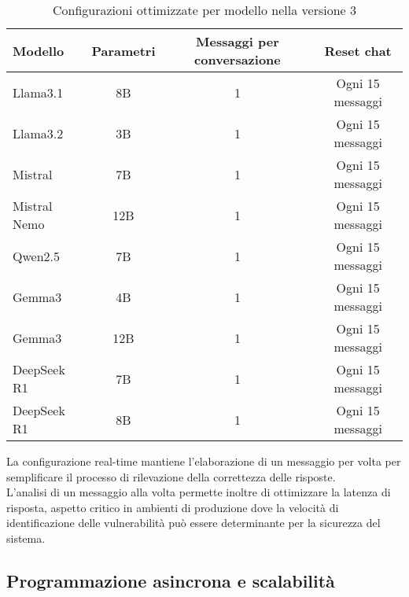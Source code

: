 \documentclass[12pt]{report}
\begin{document}
\begin{table}[h!]
    \centering
    \begin{tabular}{|l|c|c|c|}
        \hline
        \textbf{Modello} & \textbf{Parametri} & \textbf{Messaggi per conversazione} & \textbf{Reset chat} \\ \hline
        Llama3.1         & 8B                 & 1                                   & Ogni 15 messaggi    \\ \hline
        Llama3.2         & 3B                 & 1                                   & Ogni 15 messaggi    \\ \hline
        Mistral          & 7B                 & 1                                   & Ogni 15 messaggi    \\ \hline
        Mistral Nemo     & 12B                & 1                                   & Ogni 15 messaggi    \\ \hline
        Qwen2.5          & 7B                 & 1                                   & Ogni 15 messaggi    \\ \hline
        Gemma3           & 4B                 & 1                                   & Ogni 15 messaggi    \\ \hline
        Gemma3           & 12B                & 1                                   & Ogni 15 messaggi    \\ \hline
        DeepSeek R1      & 7B                 & 1                                   & Ogni 15 messaggi    \\ \hline
        DeepSeek R1      & 8B                 & 1                                   & Ogni 15 messaggi    \\ \hline
    \end{tabular}
    \caption{Configurazioni ottimizzate per modello nella versione 3}
    \label{tab:modelli_llm_ver3}
\end{table}

La configurazione real-time mantiene l'elaborazione di un messaggio per volta per semplificare il processo di rilevazione della correttezza delle risposte. \\
L'analisi di un messaggio alla volta permette inoltre di ottimizzare la latenza di risposta, aspetto critico in ambienti di produzione dove la velocità di identificazione delle vulnerabilità può essere determinante per la sicurezza del sistema.

\subsection{Programmazione asincrona e scalabilità}
\label{subsec:ver3_asincrona}
\end{document}
